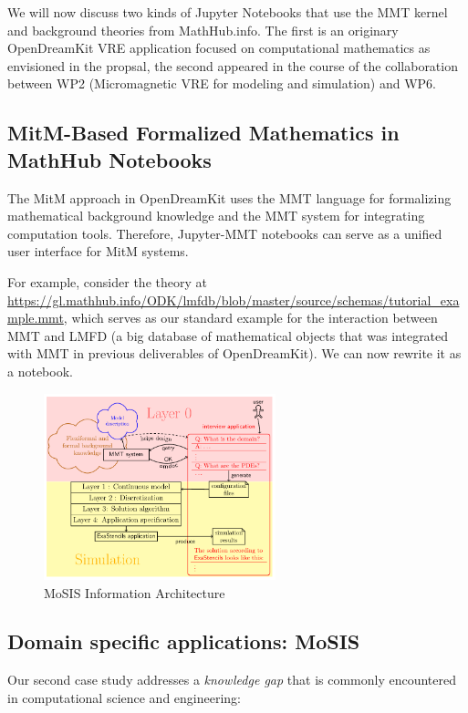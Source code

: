 We will now discuss two kinds of Jupyter Notebooks that use the MMT kernel and background theories from MathHub.info.
The first is an originary OpenDreamKit VRE application focused on computational mathematics as envisioned in the propsal, the second appeared in the course of the collaboration between WP2 (Micromagnetic VRE for modeling and simulation) and WP6. 

\subsection{MitM-Based Formalized Mathematics in MathHub Notebooks}

The MitM approach in  OpenDreamKit uses the MMT language for formalizing mathematical background knowledge and the MMT system for integrating computation tools.
Therefore, Jupyter-MMT notebooks can serve as a unified user interface for MitM systems.

For example, consider the theory at \url{https://gl.mathhub.info/ODK/lmfdb/blob/master/source/schemas/tutorial_example.mmt}, which serves as our standard example for the interaction between MMT and LMFD (a big database of mathematical objects that was integrated with MMT in previous deliverables of OpenDreamKit).
We can now rewrite it as a notebook.

\begin{figure}[ht]\centering
  \includegraphics[width=0.6\textwidth]{proto}
  \caption{MoSIS Information Architecture}\label{fig:prototype}
\end{figure}

\subsection{Domain specific applications: MoSIS}

Our second case study addresses a \emph{knowledge gap} that is commonly encountered in computational science and engineering:

